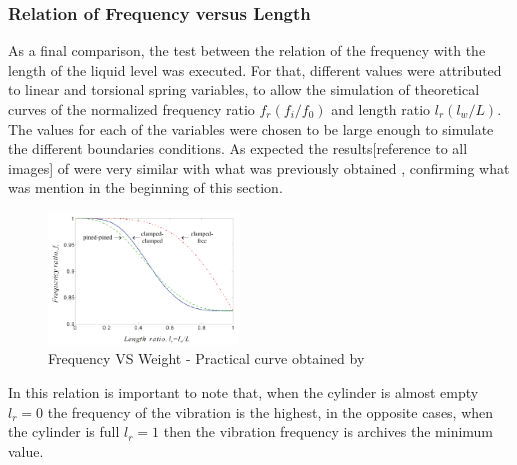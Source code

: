     \subsubsection{Relation of Frequency versus Length}
    As a final comparison, the test between the relation of the frequency with the length of the liquid level was executed. For that, different values were attributed to linear and torsional spring variables, to allow the simulation of theoretical curves of the normalized frequency ratio $f_r (f_i/f_0)$ and length ratio $l_r (l_w/L)$. The values for each of the variables were chosen to be large enough to simulate the different boundaries conditions. As expected the results[reference to all images] of \citeauthor{wuLiquidLevelDetector2014b} were very similar with what was previously obtained \cite{chanFreeVibrationCantilever1995}\cite{chanFREEVIBRATIONSIMPLY1996}\cite{jacobsContactlessLiquidDetection2005}, confirming what was mention in the beginning of this section.
    \begin{figure}[!htb]
        \centering
        \includegraphics[width=0.45\textwidth]{Chapters/2CHP/Diagrams/theoricalcurve.pdf}
        \caption{Frequency VS Weight - Practical curve obtained by \citeauthor{wuLiquidLevelDetector2014b}}
        \label{fig:theoCurves}
    \end{figure}
    In this relation is important to note that, when the cylinder is almost empty $l_r = 0$ the frequency of the vibration is the highest, in the opposite cases, when the cylinder is full $l_r = 1$ then the vibration frequency is archives the minimum value. 
